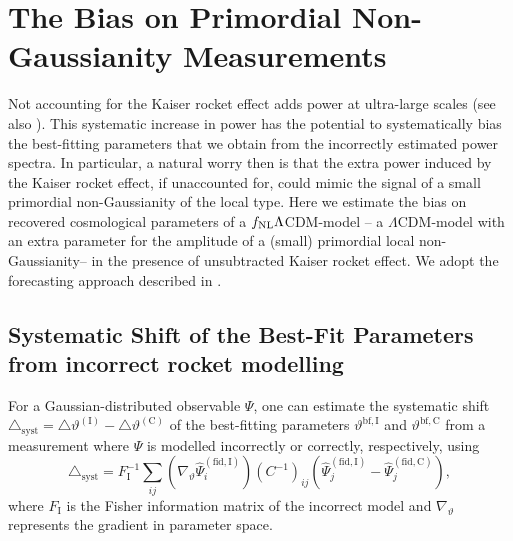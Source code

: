\documentclass[a4paper,11pt]{article}
\begin{document}
\section{The Bias on Primordial Non-Gaussianity Measurements}
\label{sec:fisherbias}
Not accounting for the Kaiser rocket effect adds power at ultra-large scales (see also \cite{Bertacca:2019wyg}). This systematic increase in power has the potential to systematically bias the best-fitting parameters that we obtain from the incorrectly estimated power spectra.
In particular, a natural worry then is that the extra power induced by the Kaiser rocket effect, if unaccounted for, could mimic the signal of a small primordial non-Gaussianity of the local type. Here we  estimate the bias on recovered cosmological parameters of a $f_{\rm NL} \Lambda $CDM-model -- a  $\Lambda $CDM-model with an extra parameter  for the amplitude of a (small) primordial local non-Gaussianity-- in the presence of unsubtracted Kaiser rocket effect. We adopt the forecasting approach  described in \cite{Taylor:2006aw,Heavens:2007ka,Taruya:2010mx,Taylor:2012kz,Duncan:2013haa,Natarajan:2014xba,Camera:2014sba,Pullen:2015yba,Cardona:2016qxn,Sellentin:2017fbg,Raccanelli:2017kht,Kodwani:2018uaf,Mike:2018zvb,Jelic-Cizmek:2020pkh,Bernal:2020pwq}.
\subsection{Systematic Shift of the Best-Fit Parameters from incorrect rocket modelling}
 For a Gaussian-distributed observable $\Psi$, one can estimate the systematic shift $\triangle_\mathrm{syst} = \triangle\vartheta^\mathrm{(I)} - \triangle\vartheta^\mathrm{(C)}$ of the best-fitting parameters $\vartheta^\mathrm{bf, I}$ and $\vartheta^\mathrm{bf, C}$ from a measurement where $\Psi$ is modelled incorrectly or correctly, respectively, using \cite{Taylor:2006aw,Heavens:2007ka,Taruya:2010mx,Taylor:2012kz,Duncan:2013haa,Natarajan:2014xba,Camera:2014sba,Pullen:2015yba,Cardona:2016qxn,Sellentin:2017fbg,Raccanelli:2017kht,Kodwani:2018uaf,Mike:2018zvb,Jelic-Cizmek:2020pkh,Bernal:2020pwq}
 \begin{equation}
    \triangle_\mathrm{syst} = F_\mathrm{I}^{-1}\sum_{ij}\left(\nabla_\vartheta \hat\Psi_i^\mathrm{(fid, I)}\right)\left(C^{-1}\right)_{ij}\left(\hat\Psi_j^\mathrm{(fid, I)}-\hat\Psi_j^\mathrm{(fid, C)}\right),
    \label{eq:Fisher_shift}
\end{equation}
where $F_\mathrm{I}$
is the Fisher information matrix of the incorrect model and $\nabla_\vartheta$ represents the gradient in parameter space.
\end{document}
